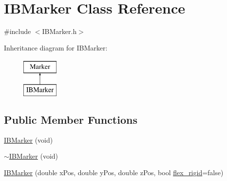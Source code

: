 \hypertarget{class_i_b_marker}{}\section{I\+B\+Marker Class Reference}
\label{class_i_b_marker}


{\ttfamily \#include $<$I\+B\+Marker.\+h$>$}

Inheritance diagram for I\+B\+Marker\+:\begin{figure}[H]
\begin{center}
\leavevmode
\includegraphics[height=2.000000cm]{class_i_b_marker}
\end{center}
\end{figure}
\subsection*{Public Member Functions}
\begin{DoxyCompactItemize}
\item 
\hyperlink{class_i_b_marker_ab45e9679ae96b75ab7655e738807bb41}{I\+B\+Marker} (void)
\item 
\hyperlink{class_i_b_marker_a0f3e177c42c3d616a2bbf96c0a9c1099}{$\sim$\+I\+B\+Marker} (void)
\item 
\hyperlink{class_i_b_marker_ae3a7dc30b6910d1aa405810a2e3956b3}{I\+B\+Marker} (double x\+Pos, double y\+Pos, double z\+Pos, bool \hyperlink{class_i_b_marker_a826fd907814ce9c6e40bcbdbd359ec7e}{flex\+\_\+rigid}=false)
\end{DoxyCompactItemize}
